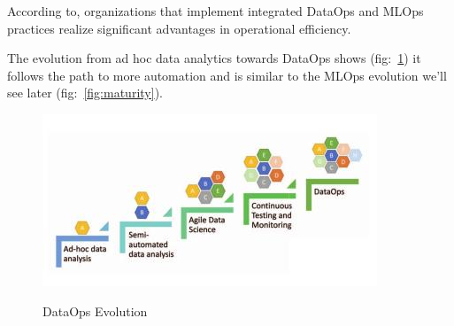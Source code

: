 According to\cite{dataops-mlops}, organizations that implement integrated DataOps and MLOps practices
realize significant advantages in
operational efficiency.

The evolution from ad hoc data analytics towards DataOps shows (fig:~\ref{fig:dataops-evo}) it follows the path to more automation
and is similar to the MLOps evolution we'll see later (fig:~\ref{fig:maturity}).
\begin{figure}[!htbp]
    \caption{DataOps Evolution\cite{ad-hoc-dataops}}
    \centering
    \includegraphics[scale=0.5]{images/dataops-evo}
    \label{fig:dataops-evo}
\end{figure}

